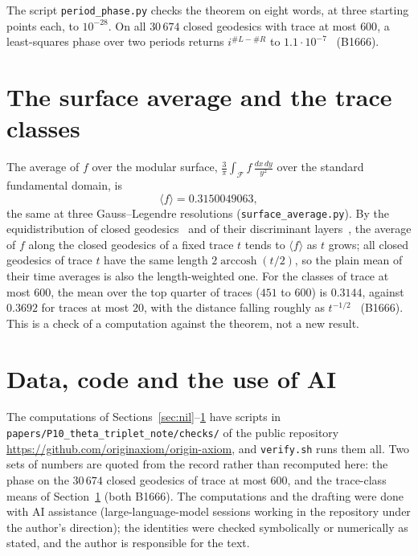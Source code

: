 \documentclass[11pt]{article}
\theoremstyle{remark}
\begin{document}
The script \texttt{period\_phase.py} checks the theorem on eight words, at three starting points each, to $10^{-28}$.
On all $30\,674$ closed geodesics with trace at most $600$, a least-squares phase over two periods returns $i^{\#L-\#R}$ to
$1.1\cdot10^{-7}$~\cite{OriginAxiomRepo} (B1666).

\section{The surface average and the trace classes}\label{sec:avg}

The average of $f$ over the modular surface, $\frac3\pi\int_{\mathcal F}f\,\frac{dx\,dy}{y^2}$ over the standard fundamental domain,
is
\[
  \langle f\rangle=0.3150049063,
\]
the same at three Gauss--Legendre resolutions (\texttt{surface\_average.py}). By the equidistribution of closed
geodesics~\cite{Bowen1972,Margulis2004} and of their discriminant layers~\cite{Duke1988,Sarnak1982}, the average of $f$ along
the closed geodesics of a fixed trace $t$ tends to $\langle f\rangle$ as $t$ grows; all closed geodesics of trace $t$ have
the same length $2\operatorname{arccosh}(t/2)$, so the plain mean of their time averages is also the length-weighted one.
For the classes of trace at most $600$, the mean over the top quarter of traces ($451$ to $600$) is $0.3144$, against
$0.3692$ for traces at most $20$, with the distance falling roughly as $t^{-1/2}$~\cite{OriginAxiomRepo} (B1666). This is a
check of a computation against the theorem, not a new result.

\section*{Data, code and the use of AI}

The computations of Sections~\ref{sec:nil}--\ref{sec:avg} have scripts in \texttt{papers/P10\_theta\_triplet\_note/checks/}
of the public repository \url{https://github.com/originaxiom/origin-axiom}, and \texttt{verify.sh} runs them all. Two sets
of numbers are quoted from the record rather than recomputed here: the phase on the $30\,674$ closed geodesics of trace at
most $600$, and the trace-class means of Section~\ref{sec:avg} (both B1666). The computations and the drafting
were done with AI assistance (large-language-model sessions working in the repository under the author's direction);
the identities were checked symbolically or numerically as stated, and the author is responsible for the text.



\end{document}
